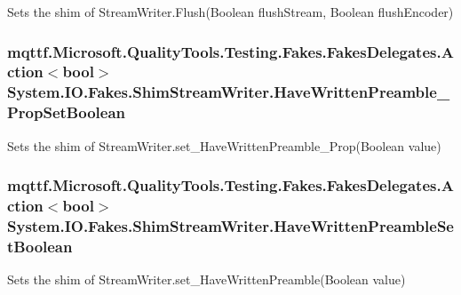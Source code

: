 Sets the shim of Stream\-Writer.\-Flush(\-Boolean flush\-Stream, Boolean flush\-Encoder)

\hypertarget{class_system_1_1_i_o_1_1_fakes_1_1_shim_stream_writer_a256097e00619b97af41149bf583879f4}{
\subsubsection[{Have\-Written\-Preamble\-\_\-\-Prop\-Set\-Boolean}]{\setlength{\rightskip}{0pt plus 5cm}mqttf.\-Microsoft.\-Quality\-Tools.\-Testing.\-Fakes.\-Fakes\-Delegates.\-Action$<$bool$>$ System.\-I\-O.\-Fakes.\-Shim\-Stream\-Writer.\-Have\-Written\-Preamble\-\_\-\-Prop\-Set\-Boolean\hspace{0.3cm}{\ttfamily [set]}}}\label{class_system_1_1_i_o_1_1_fakes_1_1_shim_stream_writer_a256097e00619b97af41149bf583879f4}


Sets the shim of Stream\-Writer.\-set\-\_\-\-Have\-Written\-Preamble\-\_\-\-Prop(\-Boolean value)

\hypertarget{class_system_1_1_i_o_1_1_fakes_1_1_shim_stream_writer_ae1fa246a65e8f996d8cdc6f73830d65f}{
\subsubsection[{Have\-Written\-Preamble\-Set\-Boolean}]{\setlength{\rightskip}{0pt plus 5cm}mqttf.\-Microsoft.\-Quality\-Tools.\-Testing.\-Fakes.\-Fakes\-Delegates.\-Action$<$bool$>$ System.\-I\-O.\-Fakes.\-Shim\-Stream\-Writer.\-Have\-Written\-Preamble\-Set\-Boolean\hspace{0.3cm}{\ttfamily [set]}}}\label{class_system_1_1_i_o_1_1_fakes_1_1_shim_stream_writer_ae1fa246a65e8f996d8cdc6f73830d65f}


Sets the shim of Stream\-Writer.\-set\-\_\-\-Have\-Written\-Preamble(\-Boolean value)

